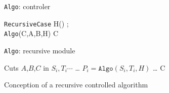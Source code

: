 \begin{figure}[htbp]
	\small
        \hfil
        \begin{minipage}{0.47\textwidth}
                \begin{algorithm}[H]
                        \caption{\texttt{Algo}: controler}
                        \label{alg:controle}
			{
				{\tt RecursiveCase} H() ; \\
				{\tt Algo}(C,A,B,H)
			}
                        \KwRet C \;
                \end{algorithm}
        \end{minipage}
        \hfil
        \begin{minipage}{0.47\textwidth}
                \begin{algorithm}[H]
                        \DontPrintSemicolon
                        \caption{\texttt{Algo}: recursive module}
                        \label{alg:action}
                        Cuts $A$,$B$,$C$ in $S_i, T_i\cdots$\;
                        \ldots \;
                        $P_i = \mathtt{Algo}(S_i,T_i,H)$ \;
                        \ldots \;
                        \KwRet C \;
                \end{algorithm}
        \end{minipage}
        \hfil
        \caption{Conception of a recursive controlled algorithm}
        \label{fig:seuil}
\end{figure}
